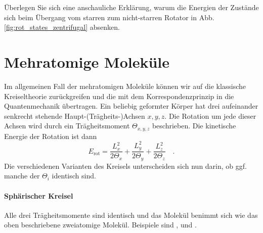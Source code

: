 \begin{questions} 
\item Überlegen Sie sich eine anschauliche Erklärung, warum die Energien der  Zustände sich beim Übergang vom starren zum nicht-starren Rotator in Abb.\ref{fig:rot_states_zentrifugal} absenken.
\end{questions}

\section{Mehratomige Moleküle}

Im allgemeinen Fall der mehratomigen Moleküle können wir auf die klassische Kreiseltheorie zurückgreifen und die mit dem Korrespondenzprinzip in die Quantenmechanik übertragen. Ein beliebig geformter Körper hat drei aufeinander senkrecht stehende Haupt-(Trägheits-)Achsen $x,y,z$. Die Rotation um jede dieser Achsen wird durch ein Trägheitsmoment $\Theta_{x,y,z}$ beschrieben. Die kinetische Energie der Rotation ist dann
\begin{equation}
E_\text{rot} = \frac{L_x^2}{2 \Theta_x} + \frac{L_y^2}{2 \Theta_y} + \frac{L_z^2}{2 \Theta_z}  \quad .
\end{equation}
Die verschiedenen Varianten des Kreisels unterscheiden sich nun darin, ob ggf. manche der $\Theta_i$ identisch sind.

\paragraph{Sphärischer Kreisel} Alle drei Trägheitsmomente sind identisch und das Molekül benimmt sich wie das oben beschriebene zweiatomige Molekül. Beispiele sind ,  und .
\begin{marginfigure}
\end{marginfigure}

